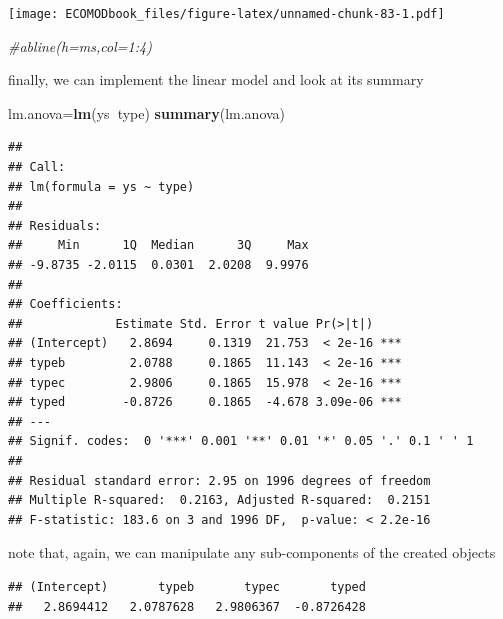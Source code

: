 \documentclass[
]{book}
\newenvironment{Shaded}{\begin{snugshade}}{\end{snugshade}}
\newcommand{\CommentTok}[1]{\textcolor[rgb]{0.56,0.35,0.01}{\textit{#1}}}
\newcommand{\DecValTok}[1]{\textcolor[rgb]{0.00,0.00,0.81}{#1}}
\newcommand{\KeywordTok}[1]{\textcolor[rgb]{0.13,0.29,0.53}{\textbf{#1}}}
\newcommand{\NormalTok}[1]{#1}
\newcommand{\OperatorTok}[1]{\textcolor[rgb]{0.81,0.36,0.00}{\textbf{#1}}}
\begin{document}
\texttt{[image: ECOMODbook\_files/figure-latex/unnamed-chunk-83-1.pdf]}

\begin{Shaded}
\begin{Highlighting}[]
\CommentTok{#abline(h=ms,col=1:4)}
\end{Highlighting}
\end{Shaded}

finally, we can implement the linear model and look at its summary

\begin{Shaded}
\begin{Highlighting}[]
\NormalTok{lm.anova=}\KeywordTok{lm}\NormalTok{(ys}\OperatorTok{~}\NormalTok{type)}
\KeywordTok{summary}\NormalTok{(lm.anova)}
\end{Highlighting}
\end{Shaded}

\begin{verbatim}
## 
## Call:
## lm(formula = ys ~ type)
## 
## Residuals:
##     Min      1Q  Median      3Q     Max 
## -9.8735 -2.0115  0.0301  2.0208  9.9976 
## 
## Coefficients:
##             Estimate Std. Error t value Pr(>|t|)    
## (Intercept)   2.8694     0.1319  21.753  < 2e-16 ***
## typeb         2.0788     0.1865  11.143  < 2e-16 ***
## typec         2.9806     0.1865  15.978  < 2e-16 ***
## typed        -0.8726     0.1865  -4.678 3.09e-06 ***
## ---
## Signif. codes:  0 '***' 0.001 '**' 0.01 '*' 0.05 '.' 0.1 ' ' 1
## 
## Residual standard error: 2.95 on 1996 degrees of freedom
## Multiple R-squared:  0.2163,	Adjusted R-squared:  0.2151 
## F-statistic: 183.6 on 3 and 1996 DF,  p-value: < 2.2e-16
\end{verbatim}

note that, again, we can manipulate any sub-components of the created objects

\begin{Shaded}
\end{Shaded}

\begin{verbatim}
## (Intercept)       typeb       typec       typed 
##   2.8694412   2.0787628   2.9806367  -0.8726428
\end{verbatim}

\begin{Shaded}
\end{Shaded}
\end{document}
